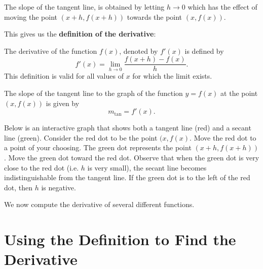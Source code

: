\documentclass{ximera}
\begin{document}
The slope of the tangent line, is obtained by letting $h \to 0$ which has the effect of 
moving the point $(x+h, f(x+h))$ towards the point 
$(x, f(x))$.  


This gives us the \textbf{definition of the derivative}:

\begin{definition}[Derivative]
The derivative of the function $f(x)$, denoted by $f'(x)$ is defined by
\[f'(x) = \lim_{h \to 0} \frac{f(x+h)-f(x)}{h}.\]
This definition is valid for all values of $x$ for which the limit exists.
\end{definition}


The slope of the tangent line to the graph of the function $y=f(x)$ at the point $(x,f(x))$
is given by
\[
m_{\text{tan}}= f'(x).
\]

Below is an interactive graph that shows both a tangent line (red) and a secant line (green).
Consider the red dot to be the point $(x, f(x)$. Move the red dot to a point of your choosing.
The green dot represents the point $(x+h, f(x+h))$. Move the green dot toward the red dot.
Observe that when the green dot is very close to the red dot (i.e. $h$ is very small), 
the secant line becomes indistinguishable from the tangent line. If the green dot is to the left of 
the red dot, then $h$ is negative.






We now compute the derivative of several different functions.\\

\section{Using the Definition to Find the Derivative}
\end{document}
